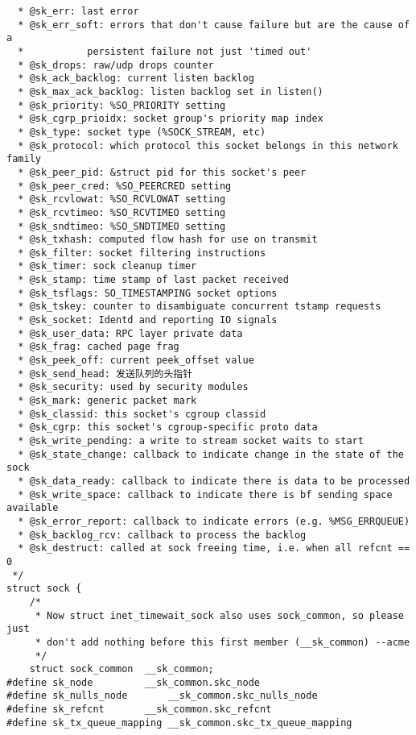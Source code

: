\begin{verbatim}
  * @sk_err: last error
  * @sk_err_soft: errors that don't cause failure but are the cause of a
  *           persistent failure not just 'timed out'
  * @sk_drops: raw/udp drops counter
  * @sk_ack_backlog: current listen backlog
  * @sk_max_ack_backlog: listen backlog set in listen()
  * @sk_priority: %SO_PRIORITY setting
  * @sk_cgrp_prioidx: socket group's priority map index
  * @sk_type: socket type (%SOCK_STREAM, etc)
  * @sk_protocol: which protocol this socket belongs in this network family
  * @sk_peer_pid: &struct pid for this socket's peer
  * @sk_peer_cred: %SO_PEERCRED setting
  * @sk_rcvlowat: %SO_RCVLOWAT setting
  * @sk_rcvtimeo: %SO_RCVTIMEO setting
  * @sk_sndtimeo: %SO_SNDTIMEO setting
  * @sk_txhash: computed flow hash for use on transmit
  * @sk_filter: socket filtering instructions
  * @sk_timer: sock cleanup timer
  * @sk_stamp: time stamp of last packet received
  * @sk_tsflags: SO_TIMESTAMPING socket options
  * @sk_tskey: counter to disambiguate concurrent tstamp requests
  * @sk_socket: Identd and reporting IO signals
  * @sk_user_data: RPC layer private data
  * @sk_frag: cached page frag
  * @sk_peek_off: current peek_offset value
  * @sk_send_head: 发送队列的头指针
  * @sk_security: used by security modules
  * @sk_mark: generic packet mark
  * @sk_classid: this socket's cgroup classid
  * @sk_cgrp: this socket's cgroup-specific proto data
  * @sk_write_pending: a write to stream socket waits to start
  * @sk_state_change: callback to indicate change in the state of the sock
  * @sk_data_ready: callback to indicate there is data to be processed
  * @sk_write_space: callback to indicate there is bf sending space available
  * @sk_error_report: callback to indicate errors (e.g. %MSG_ERRQUEUE)
  * @sk_backlog_rcv: callback to process the backlog
  * @sk_destruct: called at sock freeing time, i.e. when all refcnt == 0
 */
struct sock {
    /*
     * Now struct inet_timewait_sock also uses sock_common, so please just
     * don't add nothing before this first member (__sk_common) --acme
     */
    struct sock_common  __sk_common;
#define sk_node         __sk_common.skc_node
#define sk_nulls_node       __sk_common.skc_nulls_node
#define sk_refcnt       __sk_common.skc_refcnt
#define sk_tx_queue_mapping __sk_common.skc_tx_queue_mapping


\end{verbatim}
